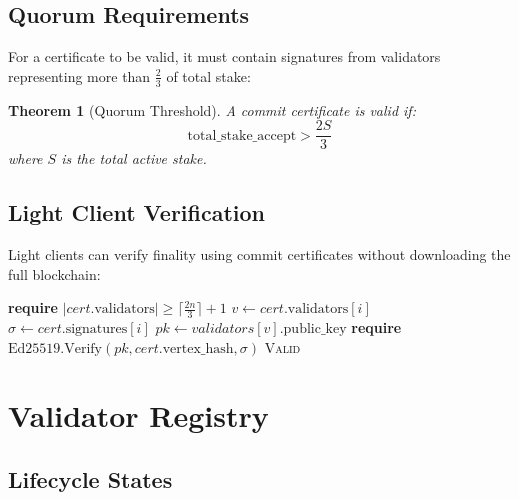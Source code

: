 \documentclass[11pt,a4paper]{article}
\newtheorem{theorem}{Theorem}
\begin{document}
\subsection{Quorum Requirements}

For a certificate to be valid, it must contain signatures from validators representing more than $\frac{2}{3}$ of total stake:

\begin{theorem}[Quorum Threshold]
A commit certificate is valid if:
$$\text{total\_stake\_accept} > \frac{2S}{3}$$
where $S$ is the total active stake.
\end{theorem}

\subsection{Light Client Verification}

Light clients can verify finality using commit certificates without downloading the full blockchain:

\begin{algorithm}
\caption{Light Client Verification}
\begin{algorithmic}[1]
    \State \textbf{require} $|cert.\text{validators}| \geq \lceil\frac{2n}{3}\rceil + 1$
        \State $v \gets cert.\text{validators}[i]$
        \State $\sigma \gets cert.\text{signatures}[i]$
        \State $pk \gets validators[v].\text{public\_key}$
        \State \textbf{require} $\text{Ed25519.Verify}(pk, cert.\text{vertex\_hash}, \sigma)$
    \EndFor
    \State \Return \textsc{Valid}
\EndProcedure
\end{algorithmic}
\end{algorithm}

\section{Validator Registry}

\subsection{Lifecycle States}

\begin{center}
\end{center}
\end{document}
